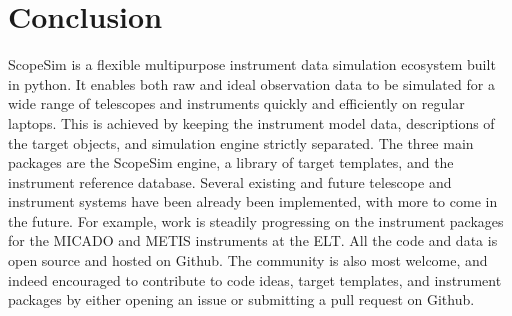 

\section{Conclusion%
  \label{conclusion}%
}

ScopeSim is a flexible multipurpose instrument data simulation ecosystem built in python.
It enables both raw and ideal observation data to be simulated for a wide range of telescopes and instruments quickly and efficiently on regular laptops.
This is achieved by keeping the instrument model data, descriptions of the target objects, and simulation engine strictly separated.
The three main packages are the ScopeSim engine, a library of target templates, and the instrument reference database.
Several existing and future telescope and instrument systems have been already been implemented, with more to come in the future.
For example, work is steadily progressing on the instrument packages for the MICADO and METIS instruments at the ELT.
All the code and data is open source and hosted on Github.
The community is also most welcome, and indeed encouraged to contribute to code ideas, target templates, and instrument packages by either opening an issue or submitting a pull request on Github.
